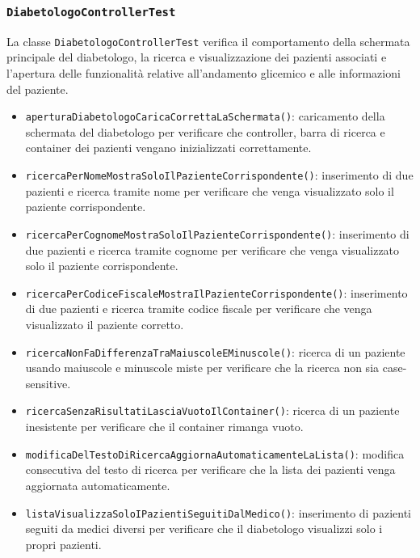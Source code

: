 \subsubsection*{\texttt{DiabetologoControllerTest}}

La classe \texttt{DiabetologoControllerTest} verifica il comportamento della schermata principale del diabetologo, la ricerca e visualizzazione dei pazienti associati e l'apertura delle funzionalità relative all'andamento glicemico e alle informazioni del paziente.

\begin{itemize}
	
	\item \texttt{aperturaDiabetologoCaricaCorrettaLaSchermata()}: caricamento della schermata del diabetologo per verificare che controller, barra di ricerca e container dei pazienti vengano inizializzati correttamente.
	
	\item \texttt{ricercaPerNomeMostraSoloIlPazienteCorrispondente()}: inserimento di due pazienti e ricerca tramite nome per verificare che venga visualizzato solo il paziente corrispondente.
	
	\item \texttt{ricercaPerCognomeMostraSoloIlPazienteCorrispondente()}: inserimento di due pazienti e ricerca tramite cognome per verificare che venga visualizzato solo il paziente corrispondente.
	
	\item \texttt{ricercaPerCodiceFiscaleMostraIlPazienteCorrispondente()}: inserimento di due pazienti e ricerca tramite codice fiscale per verificare che venga visualizzato il paziente corretto.
	
	\item \texttt{ricercaNonFaDifferenzaTraMaiuscoleEMinuscole()}: ricerca di un paziente usando maiuscole e minuscole miste per verificare che la ricerca non sia case-sensitive.
	
	\item \texttt{ricercaSenzaRisultatiLasciaVuotoIlContainer()}: ricerca di un paziente inesistente per verificare che il container rimanga vuoto.
	
	\item \texttt{modificaDelTestoDiRicercaAggiornaAutomaticamenteLaLista()}: modifica consecutiva del testo di ricerca per verificare che la lista dei pazienti venga aggiornata automaticamente.
	
	\item \texttt{listaVisualizzaSoloIPazientiSeguitiDalMedico()}: inserimento di pazienti seguiti da medici diversi per verificare che il diabetologo visualizzi solo i propri pazienti.
	

\end{itemize}
